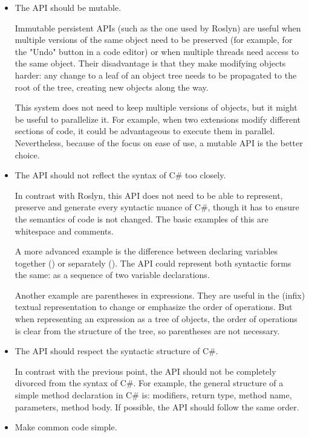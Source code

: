 \begin{itemize}
\item The \ac{API} should be mutable.

Immutable persistent \acp{API} (such as the one used by Roslyn) are useful when multiple versions of the same object need to be preserved (for example, for the "Undo" button in a code editor) or when multiple threads need access to the same object. Their disadvantage is that they make modifying objects harder: any change to a leaf of an object tree needs to be propagated to the root of the tree, creating new objects along the way.

This system does not need to keep multiple versions of objects, but it might be useful to parallelize it. For example, when two extensions modify different sections of code, it could be advantageous to execute them in parallel. Nevertheless, because of the focus on ease of use, a mutable \ac{API} is the better choice.

\item The \ac{API} should not reflect the syntax of C\# too closely.

In contrast with Roslyn, this \ac{API} does not need to be able to represent, preserve and generate every syntactic nuance of C\#, though it has to ensure the semantics of code is not changed. The basic examples of this are whitespace and comments.

A more advanced example is the difference between declaring variables together () or separately (). The \ac{API} could represent both syntactic forms the same: as a sequence of two variable declarations. 

Another example are parentheses in expressions. They are useful in the (infix) textual representation to change or emphasize the order of operations. But when representing an expression as a tree of objects, the order of operations is clear from the structure of the tree, so parentheses are not necessary.

\item The \ac{API} should respect the syntactic structure of C\#.

In contrast with the previous point, the \ac{API} should not be completely divorced from the syntax of C\#. For example, the general structure of a simple method declaration in C\# is: modifiers, return type, method name, parameters, method body. If possible, the \ac{API} should follow the same order.

\item Make common code simple.


\end{itemize}
